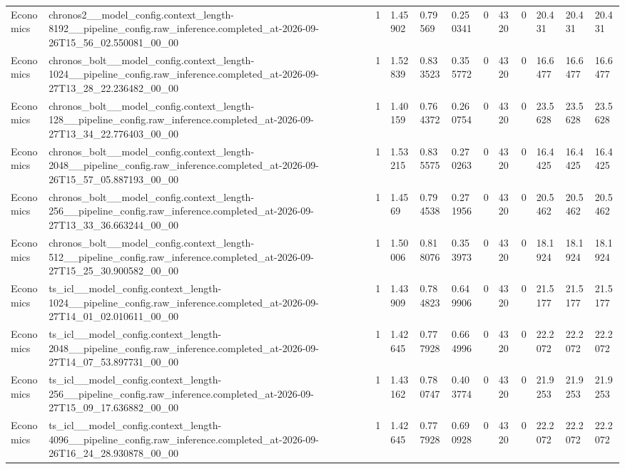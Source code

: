 \begin{tabular}{llllllllllll}
Economics & chronos2\_\_model\_config.context\_length-8192\_\_pipeline\_config.raw\_inference.completed\_at-2026-09-26T15\_56\_02.550081\_00\_00 & 1 & 1.45902 & 0.79569 & 0.250341 & 0 & 4320 & 0 & 20.431 & 20.431 & 20.431 \\
Economics & chronos\_bolt\_\_model\_config.context\_length-1024\_\_pipeline\_config.raw\_inference.completed\_at-2026-09-27T13\_28\_22.236482\_00\_00 & 1 & 1.52839 & 0.833523 & 0.355772 & 0 & 4320 & 0 & 16.6477 & 16.6477 & 16.6477 \\
Economics & chronos\_bolt\_\_model\_config.context\_length-128\_\_pipeline\_config.raw\_inference.completed\_at-2026-09-27T13\_34\_22.776403\_00\_00 & 1 & 1.40159 & 0.764372 & 0.260754 & 0 & 4320 & 0 & 23.5628 & 23.5628 & 23.5628 \\
Economics & chronos\_bolt\_\_model\_config.context\_length-2048\_\_pipeline\_config.raw\_inference.completed\_at-2026-09-26T15\_57\_05.887193\_00\_00 & 1 & 1.53215 & 0.835575 & 0.270263 & 0 & 4320 & 0 & 16.4425 & 16.4425 & 16.4425 \\
Economics & chronos\_bolt\_\_model\_config.context\_length-256\_\_pipeline\_config.raw\_inference.completed\_at-2026-09-27T13\_33\_36.663244\_00\_00 & 1 & 1.4569 & 0.794538 & 0.271956 & 0 & 4320 & 0 & 20.5462 & 20.5462 & 20.5462 \\
Economics & chronos\_bolt\_\_model\_config.context\_length-512\_\_pipeline\_config.raw\_inference.completed\_at-2026-09-27T15\_25\_30.900582\_00\_00 & 1 & 1.50006 & 0.818076 & 0.353973 & 0 & 4320 & 0 & 18.1924 & 18.1924 & 18.1924 \\
Economics & ts\_icl\_\_model\_config.context\_length-1024\_\_pipeline\_config.raw\_inference.completed\_at-2026-09-27T14\_01\_02.010611\_00\_00 & 1 & 1.43909 & 0.784823 & 0.649906 & 0 & 4320 & 0 & 21.5177 & 21.5177 & 21.5177 \\
Economics & ts\_icl\_\_model\_config.context\_length-2048\_\_pipeline\_config.raw\_inference.completed\_at-2026-09-27T14\_07\_53.897731\_00\_00 & 1 & 1.42645 & 0.777928 & 0.664996 & 0 & 4320 & 0 & 22.2072 & 22.2072 & 22.2072 \\
Economics & ts\_icl\_\_model\_config.context\_length-256\_\_pipeline\_config.raw\_inference.completed\_at-2026-09-27T15\_09\_17.636882\_00\_00 & 1 & 1.43162 & 0.780747 & 0.403774 & 0 & 4320 & 0 & 21.9253 & 21.9253 & 21.9253 \\
Economics & ts\_icl\_\_model\_config.context\_length-4096\_\_pipeline\_config.raw\_inference.completed\_at-2026-09-26T16\_24\_28.930878\_00\_00 & 1 & 1.42645 & 0.777928 & 0.690928 & 0 & 4320 & 0 & 22.2072 & 22.2072 & 22.2072 \\

\end{tabular}
